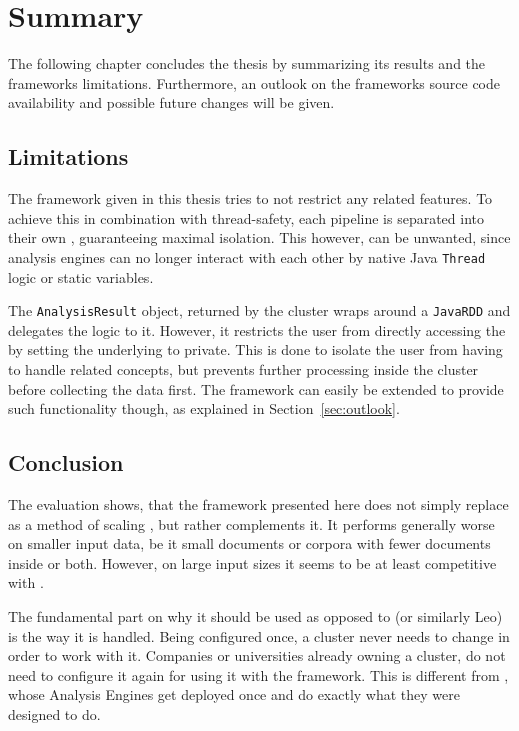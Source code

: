 \chapter{Summary}\label{ch:summary}
The following chapter concludes the thesis by summarizing its results and the frameworks limitations. Furthermore, an outlook on the frameworks source code availability and possible future changes will be given.

\section{Limitations}
The framework given in this thesis tries to not restrict any \uima{} related features. To achieve this in combination with thread-safety, each pipeline is separated into their own \jvm{}, guaranteeing maximal isolation. This however, can be unwanted, since analysis engines can no longer interact with each other by native Java \lstinline|Thread| logic or static variables. 

The \lstinline|AnalysisResult| object, returned by the \spark{} cluster wraps around a \lstinline|JavaRDD| and delegates the logic to it. However, it restricts the user from directly accessing the \spark{} \api{} by setting the underlying \rdd{} to private. This is done to isolate the user from having to handle \spark{} related concepts, but prevents further processing inside the cluster before collecting the data first. The framework can easily be extended to provide such functionality though, as explained in Section~\ref{sec:outlook}. 

\section{Conclusion}
The evaluation shows, that the framework presented here does not simply replace \uimaas{} as a method of scaling \uima{}, but rather complements it. It performs generally worse on smaller input data, be it small documents or corpora with fewer documents inside or both. However, on large input sizes it seems to be at least competitive with \uimaas{}. 

The fundamental part on why it should be used as opposed to \uimaas{} (or similarly Leo) is the way it is handled. Being configured once, a \spark{} cluster never needs to change in order to work with it. Companies or universities already owning a \spark{} cluster, do not need to configure it again for using it with the framework. This is different from \uimaas{}, whose Analysis Engines get deployed once and do exactly what they were designed to do. 

